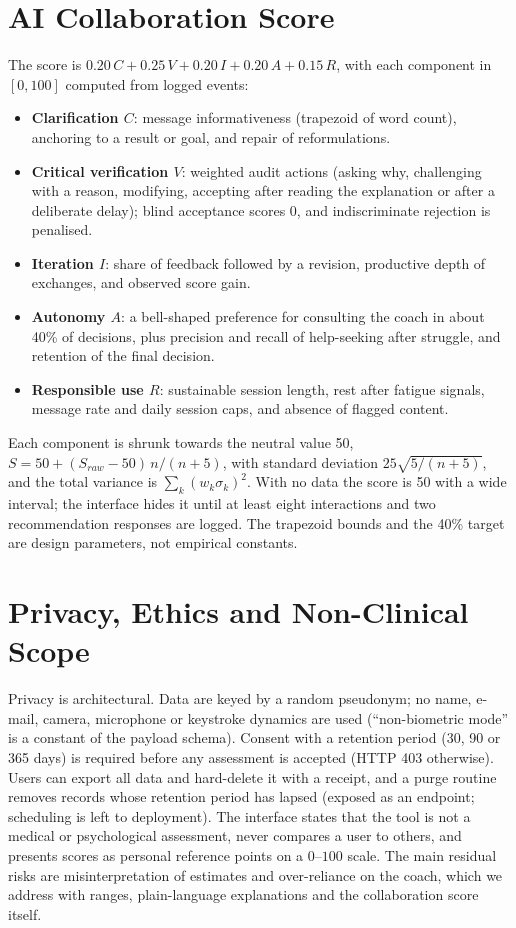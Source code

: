 \documentclass[conference]{IEEEtran}
\begin{document}
\section{AI Collaboration Score}\label{sec:collab}
The score is $0.20\,C+0.25\,V+0.20\,I+0.20\,A+0.15\,R$, with each component in $[0,100]$ computed from logged events:
\begin{itemize}
\item \textbf{Clarification $C$}: message informativeness (trapezoid of word count), anchoring to a result or goal, and repair of reformulations.
\item \textbf{Critical verification $V$}: weighted audit actions (asking why, challenging with a reason, modifying, accepting after reading the explanation or after a deliberate delay); blind acceptance scores 0, and indiscriminate rejection is penalised.
\item \textbf{Iteration $I$}: share of feedback followed by a revision, productive depth of exchanges, and observed score gain.
\item \textbf{Autonomy $A$}: a bell-shaped preference for consulting the coach in about 40\% of decisions, plus precision and recall of help-seeking after struggle, and retention of the final decision.
\item \textbf{Responsible use $R$}: sustainable session length, rest after fatigue signals, message rate and daily session caps, and absence of flagged content.
\end{itemize}
Each component is shrunk towards the neutral value 50, $S=50+(S_{raw}-50)\,n/(n+5)$, with standard deviation $25\sqrt{5/(n+5)}$, and the total variance is $\sum_k(w_k\sigma_k)^2$. With no data the score is 50 with a wide interval; the interface hides it until at least eight interactions and two recommendation responses are logged. The trapezoid bounds and the 40\% target are design parameters, not empirical constants.

\section{Privacy, Ethics and Non-Clinical Scope}\label{sec:privacy}
Privacy is architectural. Data are keyed by a random pseudonym; no name, e-mail, camera, microphone or keystroke dynamics are used (``non-biometric mode'' is a constant of the payload schema). Consent with a retention period (30, 90 or 365 days) is required before any assessment is accepted (HTTP 403 otherwise). Users can export all data and hard-delete it with a receipt, and a purge routine removes records whose retention period has lapsed (exposed as an endpoint; scheduling is left to deployment). The interface states that the tool is not a medical or psychological assessment, never compares a user to others, and presents scores as personal reference points on a $0$--$100$ scale. The main residual risks are misinterpretation of estimates and over-reliance on the coach, which we address with ranges, plain-language explanations and the collaboration score itself.
\end{document}
